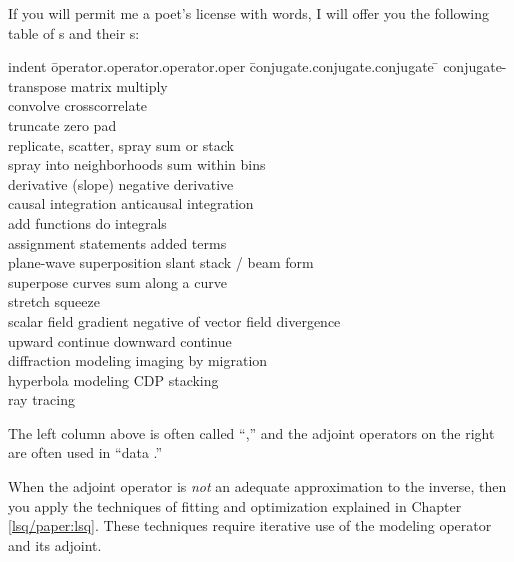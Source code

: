 \par
If you will permit me a poet's license with words,
I will offer you the following table
of s and their s:
\begin{tabbing}
indent \= operator.operator.operator.oper \=  conjugate.conjugate.conjugate \= \kill
\>          \>conjugate-transpose matrix multiply \\
\>convolve                      \>crosscorrelate        \\
\>truncate                      \>zero pad      \\
\>replicate, scatter, spray     \>sum or stack  \\
\>spray into neighborhoods      \>sum within bins   \\
\>derivative (slope)            \>negative derivative   \\
\>causal integration            \>anticausal integration        \\
\>add functions                 \>do integrals  \\
\>assignment statements         \>added terms   \\
\>plane-wave superposition      \>slant stack / beam form       \\
\>superpose curves          	\>sum along a curve \\
\>stretch                       \>squeeze       \\
\>scalar field gradient         \>negative of vector field divergence       \\
\>upward continue               \>downward continue \\
\>diffraction modeling          \>imaging by migration  \\
\>hyperbola modeling            \>CDP stacking  \\
\>ray tracing                   \>       \\
\end{tabbing}

\par
The left column above is often called ``,''
and the adjoint operators on the right are often
used in ``data .''
\par
When the adjoint operator is
{\em  not}
an adequate approximation to the inverse,
then you apply the techniques of fitting and optimization
explained in Chapter \ref{lsq/paper:lsq}.
These techniques require iterative use of the
modeling operator and its adjoint.

